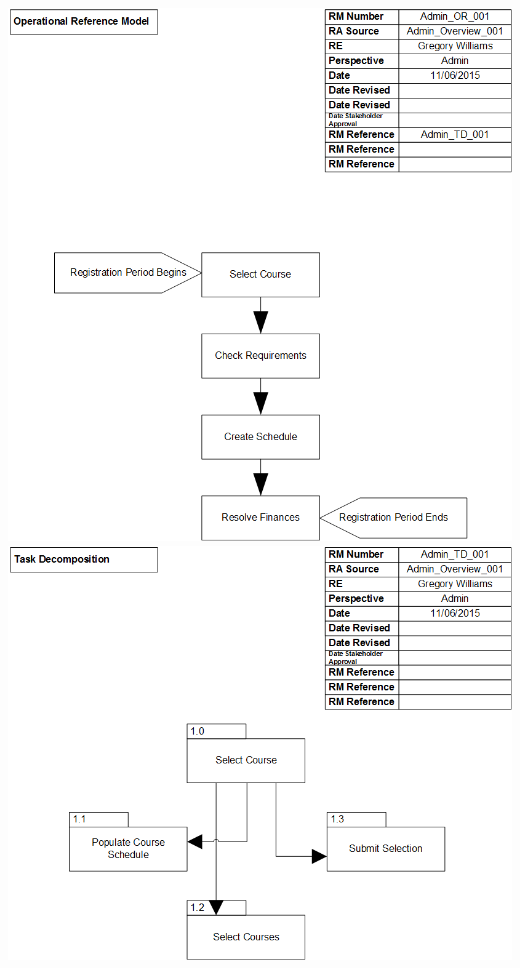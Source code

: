 \documentclass{article}
\begin{document}
	\includegraphics[width=\textwidth]{OperationalReferenceModel}
	\\
	\includegraphics[width=\textwidth]{TaskDecomposition1}
	\\
\end{document}
